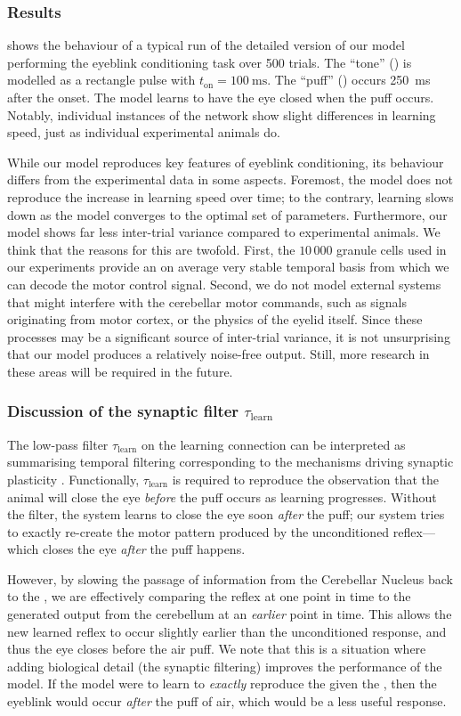 \subsubsection{Results}
 shows the behaviour of a typical run of the detailed version of our model performing the eyeblink conditioning task over 500 trials.
The \enquote{tone} (\CS) is modelled as a rectangle pulse with $t_\mathrm{on} = \SI{100}{\milli\second}$.
The \enquote{puff} (\US) occurs \SI{250}{\milli\second} after the \CS onset.
The model learns to have the eye closed when the puff occurs. Notably, individual instances of the network show slight differences in learning speed, just as individual experimental animals do.

While our model reproduces key features of eyeblink conditioning, its behaviour differs from the experimental data in some aspects.
Foremost, the model does not reproduce the increase in learning speed over time; to the contrary, learning slows down as the model converges to the optimal set of parameters.
Furthermore, our model shows far less inter-trial variance compared to experimental animals.
We think that the reasons for this are twofold.
First, the $10\,000$ granule cells used in our experiments provide an on average very stable temporal basis from which we can decode the motor control signal.
Second, we do not model external systems that might interfere with the cerebellar motor commands, such as signals originating from motor cortex, or the physics of the eyelid itself.
Since these processes may be a significant source of inter-trial variance, it is not unsurprising that our model produces a relatively noise-free output.
Still, more research in these areas will be required in the future.


\subsubsection{Discussion of the synaptic filter $\tau_\mathrm{learn}$}
The low-pass filter $\tau_\mathrm{learn}$ on the learning connection can be interpreted as summarising temporal filtering corresponding to the mechanisms driving synaptic plasticity \citep[e.g.,][Chapter~66]{kandel2012principles}.
Functionally, $\tau_\mathrm{learn}$ is required to reproduce the observation that the animal will close the eye \emph{before} the puff occurs as learning progresses.
Without the filter, the system learns to close the eye soon \emph{after} the puff; our system tries to exactly re-create the motor pattern produced by the unconditioned reflex---which closes the eye \emph{after} the puff happens.

However, by slowing the passage of information from the Cerebellar Nucleus back to the \IO, we are effectively comparing the reflex at one point in time to the generated output from the cerebellum at an \emph{earlier} point in time.
This allows the new learned reflex to occur slightly earlier than the unconditioned response, and thus the eye closes before the air puff.
We note that this is a situation where adding biological detail (the synaptic filtering) improves the performance of the model.
If the model were to learn to \textit{exactly} reproduce the \UR given the \CS, then the eyeblink would occur \textit{after} the puff of air, which would be a less useful response.
